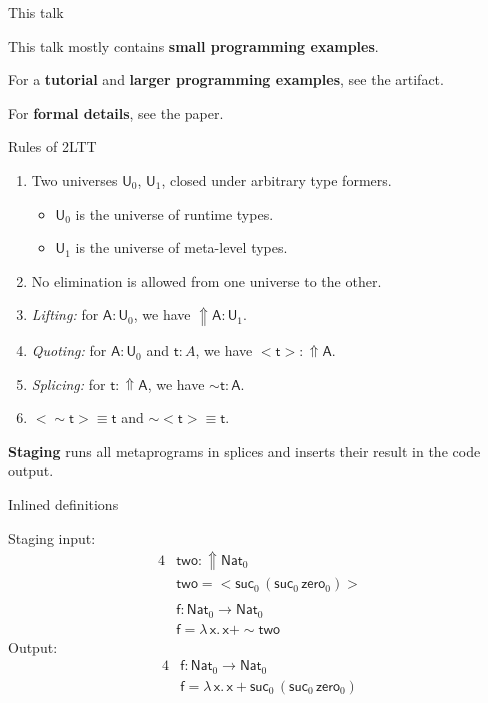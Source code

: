 \documentclass[dvipsnames,aspectratio=169]{beamer}
\newcommand{\msf}[1]{\mathsf{#1}}
\newcommand{\Lift}{{\Uparrow}}
\newcommand{\spl}{{\sim}}
\newcommand{\qut}[1]{{<}#1{>}}
\newcommand{\U}{\msf{U}}
\newcommand{\Nat}{\msf{Nat}}
\newcommand{\zero}{\msf{zero}}
\newcommand{\suc}{\msf{suc}}
\theoremstyle{remark}
\newcommand{\msA}{\msf{A}}
\newcommand{\mst}{\msf{t}}
\newcommand{\msx}{\msf{x}}
\newcommand{\msff}{\msf{f}}
\begin{document}
\begin{frame}{This talk}

This talk mostly contains \textbf{small programming examples}.
\vspace{1em}
\pause

For a \textbf{tutorial} and \textbf{larger programming examples}, see the artifact.
\vspace{1em}
\pause

For \textbf{formal details}, see the paper.

\end{frame}

\begin{frame}{Rules of 2LTT}

  \begin{enumerate}
    \item Two universes $\U_0$, $\U_1$, closed under arbitrary type formers.
      \begin{itemize}
        \item $\U_0$ is the universe of runtime types.
        \item $\U_1$ is the universe of meta-level types.
      \end{itemize}
    \pause
    \item No elimination is allowed from one universe to the other.
    \pause
    \item \emph{Lifting:} for $\msA : \U_0$, we have $\Lift \msA : \U_1$.
    \pause
    \item \emph{Quoting:} for $\msA : \U_0$ and $\mst : A$, we have $\qut{\mst} : \Lift \msA$.
    \pause
    \item \emph{Splicing:} for $\mst : \Lift \msA$, we have $\spl{\mst} : \msA$.
    \pause
    \item $\qut{\spl{\mst}} \equiv \mst$ and $\spl{\qut{\mst}} \equiv \mst$.
  \end{enumerate}
\vspace{1em}
\pause

\begin{block}{}
\textbf{Staging} runs all metaprograms in splices and inserts their result
in the code output.
\end{block}

\end{frame}

\begin{frame}{Inlined definitions}

Staging input:
\begin{alignat*}{4}
  &\msf{two} : \Lift \Nat_0 \\
  &\msf{two} = \qut{\suc_0\,(\suc_0\,\zero_0)} \\
  & \\
  & \msff : \Nat_0 \to \Nat_0 \\
  & \msff = \lambda\,\msx.\, \msx + \spl{\msf{two}}
\end{alignat*}
\pause
Output:
\begin{alignat*}{4}
  & \msff : \Nat_0 \to \Nat_0 \\
  & \msff = \lambda\,\msx.\, \msx + \suc_0\,(\suc_0\,\zero_0)
\end{alignat*}


\end{frame}
\end{document}
